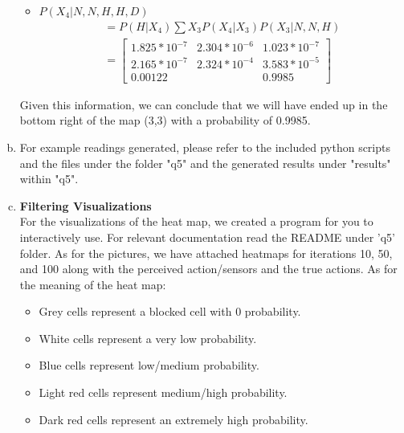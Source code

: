 \documentclass{article}
\begin{document}
\begin{enumerate}[a)]
\begin{itemize}
        \item $P(X_4 | N, N, H, H, D)$
        \begin{gather*}
            = P(H|X_4)\sum{X_3}P(X_4|X_3)P(X_3|N, N, H) \\
            =
            \begin{bmatrix}
                1.825 * 10^{-7} & 2.304 * 10^{-6} & 1.023 * 10^{-7}\\
                2.165 * 10^{-7} & 2.324 * 10^{-4} & 3.583 * 10^{-5}\\
                0.00122 & & 0.9985
            \end{bmatrix}
        \end{gather*}
    \end{itemize}
    Given this information, we can conclude that we will have ended up in the bottom right of
    the map (3,3) with a probability of 0.9985.
    
    \item For example readings generated, please refer to the included python scripts and the
        files under the folder "q5" and the generated results under "results" within "q5".
    \clearpage
    \item \textbf{Filtering Visualizations}\\
        For the visualizations of the heat map, we created a program for you to interactively use.
        For relevant documentation read the README under 'q5' folder. As for the pictures, we have
        attached heatmaps for iterations 10, 50, and 100 along with the perceived action/sensors and
        the true actions. As for the meaning of the heat map:
        \begin{itemize}
            \item Grey cells represent a blocked cell with 0 probability.
            \item White cells represent a very low probability.
            \item Blue cells represent low/medium probability.
            \item Light red cells represent medium/high probability.
            \item Dark red cells represent an extremely high probability.
        \end{itemize}
\end{enumerate}
\end{document}
